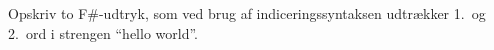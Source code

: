 Opskriv to F\#-udtryk, som ved brug af indiceringssyntaksen udtrækker 1.\ og 2.\ ord i strengen ``hello world''.
